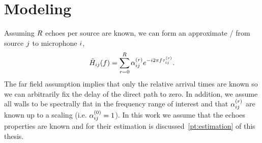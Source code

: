 \section{Modeling}

\mynewline
Assuming $R$ echoes per source are known, we can form an approximate \RTF/ from source $j$ to microphone $i$,
\begin{equation}
    \label{eq:separake:approx_tf}
    \tilde{H}_{ij}(f) = \sum_{r=0}^{R} \alpha_{ij}^{(r)} {e}^{-{i} 2 \pi f \tau_{ij}^{(r)}}.
\end{equation}
The far field assumption implies that only the relative arrival times are known so we can arbitrarily fix the delay of the direct path to zero.
In addition, we assume all walls to be spectrally flat in the frequency range of interest and that $\alpha_{ij}^{(r)}$ are known up to a scaling (i.e. $\alpha_{ij}^{(0)} = 1$).
In this work we assume that the echoes properties are known and for their estimation is discussed~\cref{pt:estimation} of this thesis.

